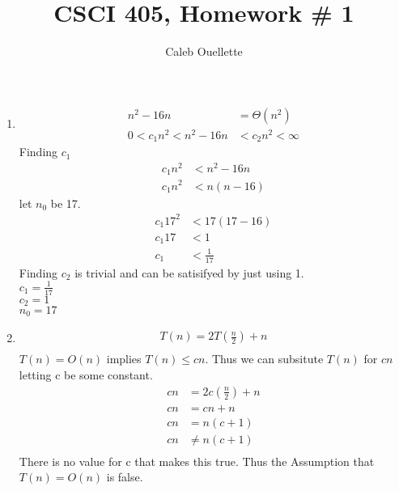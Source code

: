 \documentclass{article}
\title{CSCI 405, Homework \# 1}
\author{Caleb Ouellette}
\begin{document}
  
  \maketitle
  \begin{enumerate}
  \item
    \begin{align*}
      n^2 - 16n &= \Theta(n^2) \\
      0 < c_1 n^2 < n^2 - 16n &< c_2 n^2 < \infty
    \end{align*}
    Finding $c_1$
    \begin{align*}
      c_1 n^2 &< n^2 - 16n \\
      c_1 n^2 &< n(n - 16)
    \end{align*}
    let $n_0$ be 17.
    \begin{align*}
      c_1 17^2 &< 17(17 - 16) \\
      c_1 17 &< 1 \\
      c_1  &< \frac{1}{17}
    \end{align*}
    Finding $c_2$ is trivial and can be satisifyed by just using 1.\\
    $c_1 = \frac{1}{17}$\\
    $c_2 = 1$\\
    $n_0 = 17$\\

  
  \item 
    \begin{align*}
      T(n)= 2T(\frac{n}{2}) + n\\
    \end{align*}
    $T(n) = O(n)$ implies $T(n) \leq cn $. Thus we can subsitute $T(n)$ for $cn$ letting c be some constant.
    \begin{align*}
      cn &= 2c(\frac{n}{2}) + n\\
      cn &= cn + n\\
      cn &= n(c + 1)\\
      cn &\neq n(c + 1)\\
    \end{align*}
    There is no value for c that makes this true. Thus the Assumption that $T(n) = O(n)$ is false.


\end{enumerate}
\end{document}
